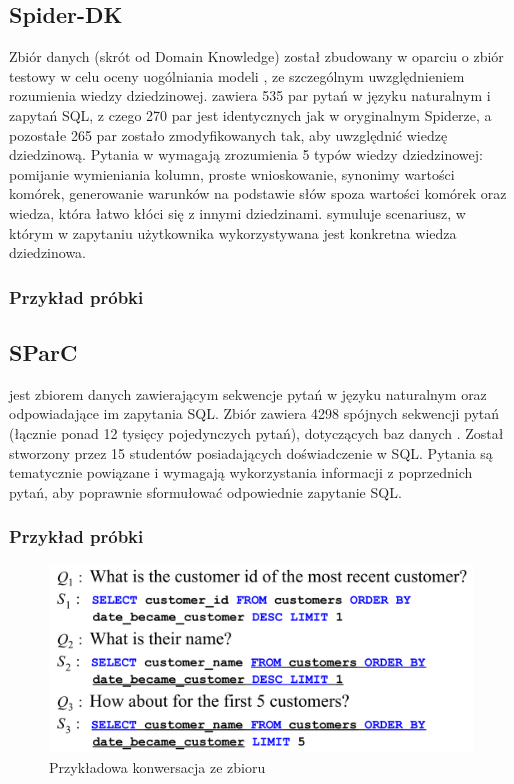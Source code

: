 \subsection{Spider-DK}
Zbiór danych  (skrót od Domain Knowledge) został zbudowany w oparciu o zbiór testowy  w celu oceny uogólniania modeli , ze szczególnym uwzględnieniem rozumienia wiedzy dziedzinowej.  zawiera 535 par pytań w języku naturalnym i zapytań SQL, z czego 270 par jest identycznych jak w oryginalnym Spiderze, a pozostałe 265 par zostało zmodyfikowanych tak, aby uwzględnić wiedzę dziedzinową. Pytania w  wymagają zrozumienia 5 typów wiedzy dziedzinowej: pomijanie wymieniania kolumn, proste wnioskowanie, synonimy wartości komórek, generowanie warunków na podstawie słów spoza wartości komórek oraz wiedza, która łatwo kłóci się z innymi dziedzinami.  symuluje scenariusz, w którym w zapytaniu użytkownika wykorzystywana jest konkretna wiedza dziedzinowa.

\subsubsection{Przykład próbki}

\begin{minipage}{\linewidth}

\end{minipage}

\subsection{SParC}
 jest zbiorem danych zawierającym sekwencje pytań w języku naturalnym oraz odpowiadające im zapytania SQL. Zbiór zawiera 4298 spójnych sekwencji pytań (łącznie ponad 12 tysięcy pojedynczych pytań), dotyczących baz danych . Został stworzony przez 15 studentów posiadających doświadczenie w SQL. Pytania są tematycznie powiązane i wymagają wykorzystania informacji z poprzednich pytań, aby poprawnie sformułować odpowiednie zapytanie SQL.

\subsubsection{Przykład próbki}

\begin{figure}[ht!]
  \centering
  \includegraphics[width=0.6\linewidth]{images/sparc_example.png}
  \caption{Przykładowa konwersacja ze zbioru }
  \label{fig:sparc-example}
\end{figure}

